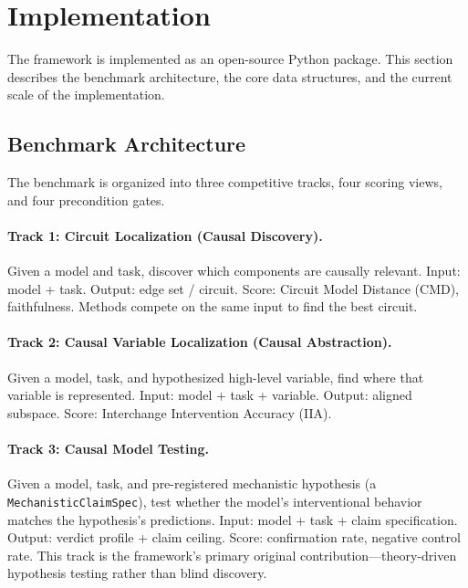 \documentclass[10pt]{article}
\begin{document}
\section{Implementation}
\label{sec:implementation}

The framework is implemented as an open-source Python package. This section describes the benchmark architecture, the core data structures, and the current scale of the implementation.

\subsection{Benchmark Architecture}
\label{sec:3t4v4g}

The benchmark is organized into three competitive tracks, four scoring views, and four precondition gates.

\paragraph{Track 1: Circuit Localization (Causal Discovery).} Given a model and task, discover which components are causally relevant. Input: model + task. Output: edge set / circuit. Score: Circuit Model Distance (CMD), faithfulness. Methods compete on the same input to find the best circuit.

\paragraph{Track 2: Causal Variable Localization (Causal Abstraction).} Given a model, task, and hypothesized high-level variable, find where that variable is represented. Input: model + task + variable. Output: aligned subspace. Score: Interchange Intervention Accuracy (IIA).

\paragraph{Track 3: Causal Model Testing.} Given a model, task, and pre-registered mechanistic hypothesis (a \texttt{MechanisticClaimSpec}), test whether the model's interventional behavior matches the hypothesis's predictions. Input: model + task + claim specification. Output: verdict profile + claim ceiling. Score: confirmation rate, negative control rate. This track is the framework's primary original contribution---theory-driven hypothesis testing rather than blind discovery.
\end{document}
